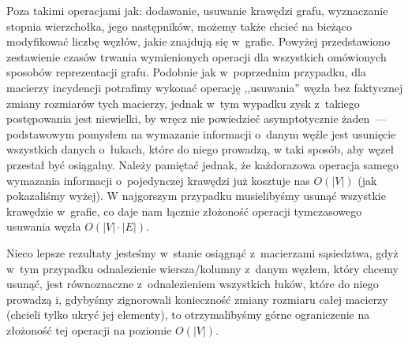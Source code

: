 Poza takimi operacjami jak: dodawanie, usuwanie krawędzi grafu, wyznaczanie stopnia wierzchołka, jego następników, możemy także chcieć na bieżąco modyfikować liczbę węzłów, jakie znajdują się w~grafie.
Powyżej przedstawiono zestawienie czasów trwania wymienionych operacji dla wszystkich omówionych sposobów reprezentacji grafu.
Podobnie jak w~poprzednim przypadku, dla macierzy incydencji potrafimy wykonać operację ,,usuwania'' węzła bez faktycznej zmiany rozmiarów tych macierzy, jednak w~tym wypadku zysk z~takiego postępowania jest niewielki, by wręcz nie powiedzieć asymptotycznie żaden~--- podstawowym pomysłem na wymazanie informacji o~danym węźle jest usunięcie wszystkich danych o~łukach, które do niego prowadzą, w taki sposób, aby węzeł przestał być osiągalny. Należy pamiętać jednak, że każdorazowa operacja samego wymazania informacji o~pojedynczej krawędzi już kosztuje nas $O \left( \left| V \right| \right)$ (jak pokazaliśmy wyżej).
W najgorszym przypadku musielibyśmy usunąć wszystkie krawędzie w~grafie, co daje nam łącznie złożoność operacji tymczasowego usuwania węzła $O \left( \left| V \right| \cdot  \left| E \right| \right)$. 

Nieco lepsze rezultaty jesteśmy w~stanie osiągnąć z~macierzami sąsiedztwa, gdyż w~tym przypadku odnalezienie wiersza/kolumny z~danym węzłem, który chcemy usunąć, jest równoznaczne z~odnalezieniem wszystkich łuków, które do niego prowadzą i, gdybyśmy zignorowali konieczność zmiany rozmiaru całej macierzy (chcieli tylko ukryć jej elementy), to otrzymalibyśmy górne ograniczenie na złożoność tej operacji na poziomie $ O \left( \left| V \right| \right)$.

